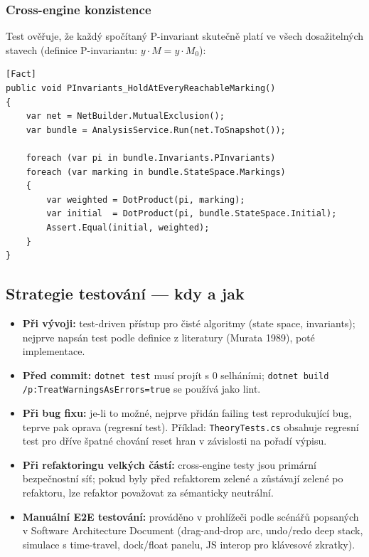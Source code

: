 \documentclass[12pt,a4paper]{article}
\begin{document}
\subsubsection{Cross-engine konzistence}

Test ověřuje, že každý spočítaný P-invariant skutečně platí ve všech
dosažitelných stavech (definice P-invariantu: $y \cdot M = y \cdot M_0$):

\begin{lstlisting}[language={[Sharp]C}]
[Fact]
public void PInvariants_HoldAtEveryReachableMarking()
{
    var net = NetBuilder.MutualExclusion();
    var bundle = AnalysisService.Run(net.ToSnapshot());

    foreach (var pi in bundle.Invariants.PInvariants)
    foreach (var marking in bundle.StateSpace.Markings)
    {
        var weighted = DotProduct(pi, marking);
        var initial  = DotProduct(pi, bundle.StateSpace.Initial);
        Assert.Equal(initial, weighted);
    }
}
\end{lstlisting}

\subsection{Strategie testování — kdy a jak}

\begin{itemize}
    \item \textbf{Při vývoji:} test-driven přístup pro čisté algoritmy
          (state space, invariants); nejprve napsán test podle
          definice z literatury (Murata 1989), poté implementace.
    \item \textbf{Před commit:} \texttt{dotnet test} musí projít s 0 selháními;
          \texttt{dotnet build /p:TreatWarningsAsErrors=true} se používá
          jako lint.
    \item \textbf{Při bug fixu:} je-li to možné, nejprve přidán failing
          test reprodukující bug, teprve pak oprava (regresní test).
          Příklad: \texttt{TheoryTests.cs} obsahuje regresní test pro
          dříve špatné chování reset hran v závislosti na pořadí výpisu.
    \item \textbf{Při refaktoringu velkých částí:} cross-engine testy
          jsou primární bezpečnostní síť; pokud byly před refaktorem
          zelené a zůstávají zelené po refaktoru, lze refaktor považovat
          za sémanticky neutrální.
    \item \textbf{Manuální E2E testování:} prováděno v prohlížeči
          podle scénářů popsaných v Software Architecture Document
          (drag-and-drop arc, undo/redo deep stack, simulace s
          time-travel, dock/float panelu, JS interop pro klávesové
          zkratky).
\end{itemize}
\end{document}
